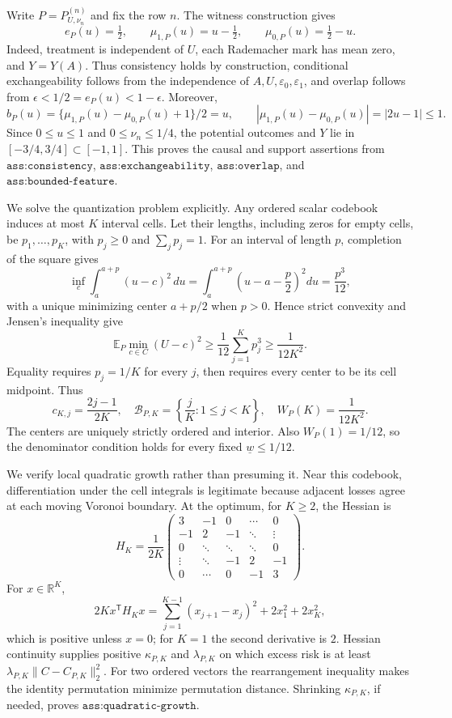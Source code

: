 Write \(P=P_{U,\nu_n}^{(n)}\) and fix the row \(n\).  The witness construction gives
\[
 e_P(u)=\tfrac12,\qquad
 \mu_{1,P}(u)=u-\tfrac12,\qquad
 \mu_{0,P}(u)=\tfrac12-u .
\]
Indeed, treatment is independent of \(U\), each Rademacher mark has mean zero, and \(Y=Y(A)\).  Thus consistency holds by construction, conditional exchangeability follows from the independence of \(A,U,\varepsilon_0,\varepsilon_1\), and overlap follows from \(\epsilon<1/2=e_P(u)<1-\epsilon\).  Moreover,
\[
 b_P(u)=\{\mu_{1,P}(u)-\mu_{0,P}(u)+1\}/2=u,
 \qquad |\mu_{1,P}(u)-\mu_{0,P}(u)|=|2u-1|\leq1.
\]
Since \(0\leq u\leq1\) and \(0\leq\nu_n\leq1/4\), the potential outcomes and \(Y\) lie in \([-3/4,3/4]\subset[-1,1]\).  This proves the causal and support assertions from \(\texttt{ass:consistency}\), \(\texttt{ass:exchangeability}\), \(\texttt{ass:overlap}\), and \(\texttt{ass:bounded-feature}\).

We solve the quantization problem explicitly.  Any ordered scalar codebook induces at most \(K\) interval cells.  Let their lengths, including zeros for empty cells, be \(p_1,\ldots,p_K\), with \(p_j\geq0\) and \(\sum_jp_j=1\).  For an interval of length \(p\), completion of the square gives
\[
 \inf_c\int_a^{a+p}(u-c)^2\,du
 =\int_a^{a+p}\left(u-a-\frac p2\right)^2du
 =\frac{p^3}{12},
\]
with a unique minimizing center \(a+p/2\) when \(p>0\).  Hence strict convexity and Jensen's inequality give
\[
 \mathbb E_P\min_{c\in C}(U-c)^2
 \geq \frac1{12}\sum_{j=1}^Kp_j^3
 \geq\frac1{12K^2}.
\]
Equality requires \(p_j=1/K\) for every \(j\), then requires every center to be its cell midpoint.  Thus
\[
 c_{K,j}=\frac{2j-1}{2K},\quad
 \mathcal B_{P,K}=\left\{\frac jK:1\leq j<K\right\},\quad
 W_P(K)=\frac1{12K^2}.
\]
The centers are uniquely strictly ordered and interior.  Also \(W_P(1)=1/12\), so the denominator condition holds for every fixed \(\underline w\leq1/12\).

We verify local quadratic growth rather than presuming it.  Near this codebook, differentiation under the cell integrals is legitimate because adjacent losses agree at each moving Voronoi boundary.  At the optimum, for \(K\geq2\), the Hessian is
\[
 H_K=\frac1{2K}
 \begin{pmatrix}
 3&-1&0&\cdots&0\\
 -1&2&-1&\ddots&\vdots\\
 0&\ddots&\ddots&\ddots&0\\
 \vdots&\ddots&-1&2&-1\\
 0&\cdots&0&-1&3
 \end{pmatrix}.
\]
For \(x\in\mathbb R^K\),
\[
 2Kx^{\mathsf T}H_Kx
 =\sum_{j=1}^{K-1}(x_{j+1}-x_j)^2+2x_1^2+2x_K^2,
\]
which is positive unless \(x=0\); for \(K=1\) the second derivative is \(2\).  Hessian continuity supplies positive \(\kappa_{P,K}\) and \(\lambda_{P,K}\) on which excess risk is at least \(\lambda_{P,K}\|C-C_{P,K}\|_2^2\).  For two ordered vectors the rearrangement inequality makes the identity permutation minimize permutation distance.  Shrinking \(\kappa_{P,K}\), if needed, proves \(\texttt{ass:quadratic-growth}\).

